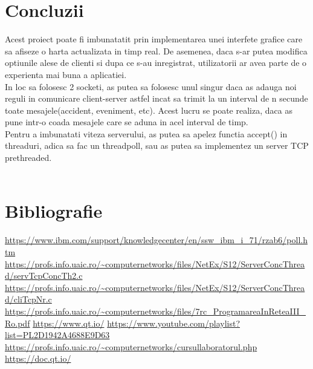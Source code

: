 \documentclass[runningheads]{llncs}
\begin{document}
\section {Concluzii}

Acest proiect poate fi imbunatatit prin implementarea unei interfete grafice care sa afiseze o harta actualizata in timp real. De asemenea, daca s-ar putea modifica optiunile alese de clienti si dupa ce s-au inregistrat, utilizatorii ar avea parte de o experienta mai buna a aplicatiei.\\

In loc sa folosesc 2 socketi, as putea sa folosesc unul singur daca as adauga noi reguli in comunicare client-server astfel incat sa trimit la un interval de n secunde toate mesajele(accident, eveniment, etc). Acest lucru se poate realiza, daca as pune intr-o coada mesajele care se aduna in acel interval de timp. \\

Pentru a imbunatati viteza serverului, as putea sa apelez functia accept() in threaduri, adica sa fac un threadpoll, sau as putea sa implementez un server TCP prethreaded.
\\
\\
\section {Bibliografie}
\begin{thebibliography}{8}
\url{https://www.ibm.com/support/knowledgecenter/en/ssw\_ibm\_i\_71/rzab6/poll.htm}
\url{https://profs.info.uaic.ro/~computernetworks/files/NetEx/S12/ServerConcThread/servTcpConcTh2.c}
\url{https://profs.info.uaic.ro/~computernetworks/files/NetEx/S12/ServerConcThread/cliTcpNr.c}
\url{https://profs.info.uaic.ro/~computernetworks/files/7rc\_ProgramareaInReteaIII\_Ro.pdf}
\url{https://www.qt.io/}
\url{https://www.youtube.com/playlist?list=PL2D1942A4688E9D63}
\url{https://profs.info.uaic.ro/~computernetworks/cursullaboratorul.php}
\url{https://doc.qt.io/}

\end{thebibliography}
\end{document}
